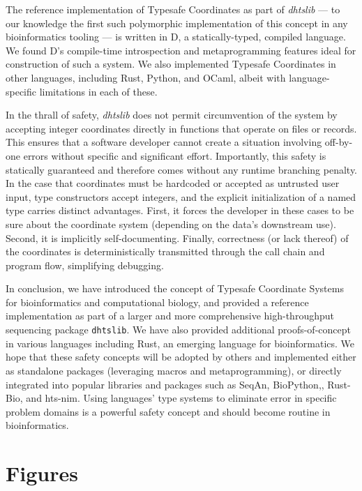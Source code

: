 \documentclass[12pt]{article}
\begin{document}
The reference implementation of Typesafe Coordinates as part of \textit{dhtslib}\cite{gregory_dhtslib_nodate} --- to our knowledge the first such polymorphic implementation of this concept in any bioinformatics tooling --- is written in D, a statically-typed, compiled language. We found D's compile-time introspection and metaprogramming features ideal for construction of such a system. We also implemented Typesafe Coordinates in other languages, including Rust, Python, and OCaml, albeit with language-specific limitations in each of these.

In the thrall of safety, \textit{dhtslib} does not permit circumvention of the system by accepting integer coordinates directly in functions that operate on files or records. This ensures that a software developer cannot create a situation involving off-by-one errors without specific and significant effort. Importantly, this safety is statically guaranteed and therefore comes without any runtime branching penalty. In the case that coordinates must be hardcoded or accepted as untrusted user input, type constructors accept integers, and the explicit initialization of a named type carries distinct advantages. First, it forces the developer in these cases to be sure about the coordinate system (depending on the data’s downstream use). Second, it is implicitly self-documenting. Finally, correctness (or lack thereof) of the coordinates is deterministically transmitted through the call chain and program flow, simplifying debugging.

In conclusion, we have introduced the concept of Typesafe Coordinate Systems for bioinformatics and computational biology, and provided a reference implementation as part of a larger and more comprehensive high-throughput sequencing package \texttt{dhtslib}. We have also provided additional proofs-of-concept in various languages including Rust, an emerging language for bioinformatics. We hope that these safety concepts will be adopted by others and implemented either as standalone packages (leveraging macros and metaprogramming), or directly integrated into popular libraries and packages such as SeqAn,\cite{reinert_seqan_2017} BioPython,\cite{cock_biopython_2009}, Rust-Bio,\cite{koster_rust-bio_2016} and hts-nim.\cite{pedersen_hts-nim_2018} Using languages' type systems to eliminate error in specific problem domains is a powerful safety concept and should become routine in bioinformatics.

\newpage
\printbibliography

\newpage
\section*{Figures}
\end{document}
